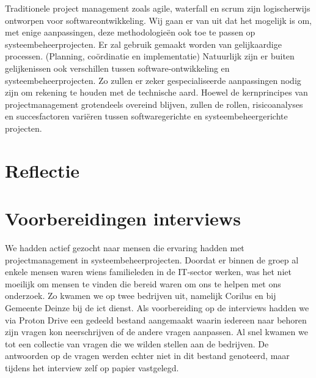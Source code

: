 \documentclass{article}
\begin{document}
    Traditionele project management zoals agile, waterfall en scrum zijn logischerwijs ontworpen voor softwareontwikkeling. 
    Wij gaan er van uit dat het mogelijk is om, met enige aanpassingen, deze methodologieën ook toe te passen op systeembeheerprojecten.
    Er zal gebruik gemaakt worden van gelijkaardige processen. (Planning, coördinatie en implementatie)
    Natuurlijk zijn er buiten gelijkenissen ook verschillen tussen software-ontwikkeling en systeembeheerprojecten. \newline
    Zo zullen er zeker gespecialiseerde aanpassingen nodig zijn om rekening te houden met de technische aard.
    Hoewel de kernprincipes van projectmanagement grotendeels overeind blijven, zullen de rollen, risicoanalyses en 
    succesfactoren variëren tussen softwaregerichte en systeembeheergerichte projecten.

    \section{Reflectie}

    \section{Voorbereidingen interviews}

We hadden actief gezocht naar mensen die ervaring hadden met projectmanagement in systeembeheerprojecten.
Doordat er binnen de groep al enkele mensen waren wiens familieleden in de IT-sector werken, was het niet moeilijk om mensen te vinden die bereid waren om ons te helpen met ons onderzoek.
Zo kwamen we op twee bedrijven uit, namelijk Corilus en bij Gemeente Deinze bij de ict dienst. \newline
Als voorbereiding op de interviews hadden we via Proton Drive een gedeeld bestand aangemaakt waarin iedereen naar behoren zijn vragen kon neerschrijven of de andere vragen aanpassen. 
Al snel kwamen we tot een collectie van vragen die we wilden stellen aan de bedrijven.
De antwoorden op de vragen werden echter niet in dit bestand genoteerd, maar tijdens het interview zelf op papier vastgelegd.
\end{document}
